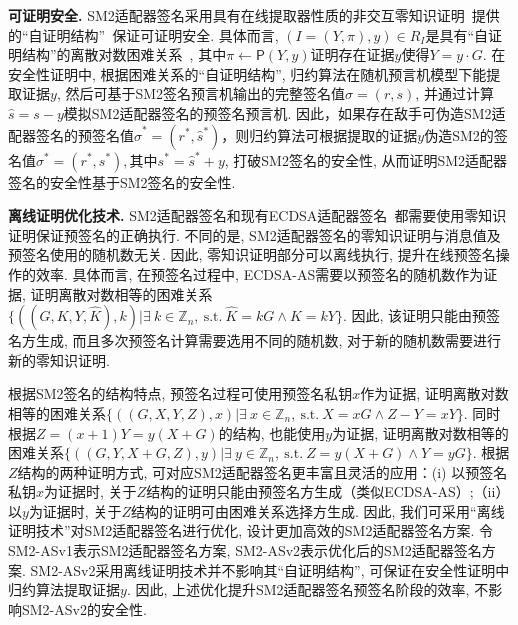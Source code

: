 \documentclass[review]{jcr}
\begin{document}
\begin{trivlist}
\item \textbf{可证明安全.} SM2适配器签名采用具有在线提取器性质的非交互零知识证明~\cite{Fischlin05}提供的``自证明结构''~\cite{AumayrEEFHMMR20}保证可证明安全. 具体而言, $(I=(Y,\pi),y)\in R_I$是具有``自证明结构''的离散对数困难关系~\cite{AumayrEEFHMMR20}, 其中$\pi\leftarrow \mathsf{P}(Y,y)$证明存在证据$y$使得$Y=y\cdot G$. 在安全性证明中, 根据困难关系的``自证明结构'',  归约算法在随机预言机模型下能提取证据$y$, 然后可基于SM2签名预言机输出的完整签名值$\sigma=(r,s)$, 并通过计算$\hat{s}=s-y$模拟SM2适配器签名的预签名预言机. 因此，如果存在敌手可伪造SM2适配器签名的预签名值$\hat{\sigma}^*=(r^*,\hat{s}^*)$，则归约算法可根据提取的证据$y$伪造SM2的签名值$\sigma^*=(r^*,s^*), 其中 s^*=\hat{s}^*+y$, 打破SM2签名的安全性, 从而证明SM2适配器签名的安全性基于SM2签名的安全性.
\end{trivlist}

\begin{trivlist}
\item \textbf{离线证明优化技术.} SM2适配器签名和现有ECDSA适配器签名~\cite{AumayrEEFHMMR20}都需要使用零知识证明保证预签名的正确执行. 不同的是,  SM2适配器签名的零知识证明与消息值及预签名使用的随机数无关. 因此, 零知识证明部分可以离线执行, 提升在线预签名操作的效率. 具体而言, 在预签名过程中, ECDSA-AS需要以预签名的随机数作为证据, 证明离散对数相等的困难关系$\{((G,K,Y,\hat{K}),k)|\exists\ k\in \mathbb{Z}_n,\ \text{s.t.}\ \hat{K}=kG\wedge K=kY\}$. 因此, 该证明只能由预签名方生成, 而且多次预签名计算需要选用不同的随机数, 对于新的随机数需要进行新的零知识证明. 

根据SM2签名的结构特点, 预签名过程可使用预签名私钥$x$作为证据, 证明离散对数相等的困难关系$\{((G,X,Y,Z),x)|\exists\ x\in \mathbb{Z}_n,\ \text{s.t.}\ X=xG\wedge Z-Y=xY\}$. 同时根据$Z=(x+1)Y=y(X+G)$的结构, 也能使用$y$为证据, 证明离散对数相等的困难关系$\{((G,Y,X+G,Z),y)|\exists\ y\in \mathbb{Z}_n,\ \text{s.t.}\ Z=y(X+G)\wedge Y=yG\}$. 根据$Z$结构的两种证明方式, 可对应SM2适配器签名更丰富且灵活的应用：(i) 以预签名私钥$x$为证据时, 关于$Z$结构的证明只能由预签名方生成（类似ECDSA-AS）;（ii）以$y$为证据时, 关于$Z$结构的证明可由困难关系选择方生成.
因此, 我们可采用``离线证明技术''对SM2适配器签名进行优化, 设计更加高效的SM2适配器签名方案. 令SM2-ASv1表示SM2适配器签名方案, SM2-ASv2表示优化后的SM2适配器签名方案. SM2-ASv2采用离线证明技术并不影响其``自证明结构'', 可保证在安全性证明中归约算法提取证据$y$. 因此, 上述优化提升SM2适配器签名预签名阶段的效率, 不影响SM2-ASv2的安全性.
\end{trivlist}
\end{document}
